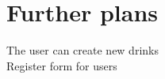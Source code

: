 \section{Further plans}
\label{sec:ideas}

The user can create new drinks\\
Register form for users\\